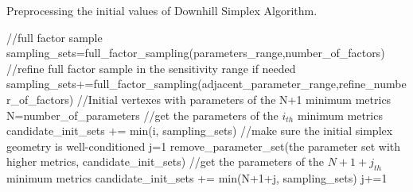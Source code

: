 \documentclass[gmd, manuscript]{copernicus}
\begin{document}
\begin{algorithm}[htb]
\caption{Preprocessing the initial values of Downhill Simplex Algorithm.} 
\label{alg:sequential-operation}
\begin{algorithmic}
\STATE //full factor sample 
\STATE sampling\_sets=full\_factor\_sampling(parameters\_range,number\_of\_factors) 
\STATE //refine full factor sample in the sensitivity range if needed
\STATE sampling\_sets+=full\_factor\_sampling(adjacent\_parameter\_range,refine\_number\_of\_factors)
\ENDIF
\STATE
\STATE //Initial vertexes with parameters of the N+1 minimum metrics
\STATE N=number\_of\_parameters 
\STATE //get the parameters of the $i_{th}$ minimum metrics
\STATE candidate\_init\_sets += min(i, sampling\_sets) 
\ENDFOR
\STATE
\STATE //make sure the initial simplex geometry is well-conditioned
\STATE j=1
\STATE remove\_parameter\_set(the parameter set with higher metrics, candidate\_init\_sets)
\STATE //get the parameters of the $N+1+j_{th}$ minimum metrics
\STATE candidate\_init\_sets += min(N+1+j, sampling\_sets)
\STATE j+=1
\ENDWHILE
\end{algorithmic}
\end{algorithm}








\end{document}
